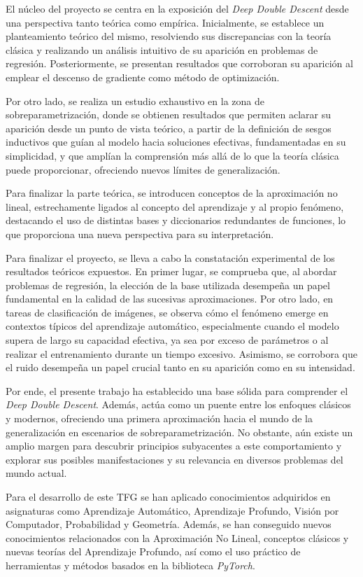 El núcleo del proyecto se centra en la exposición del \textit{Deep Double Descent} desde una perspectiva tanto teórica como empírica. Inicialmente, se establece un planteamiento teórico del mismo, resolviendo sus discrepancias con la teoría clásica y realizando un análisis intuitivo de su aparición en problemas de regresión. Posteriormente, se presentan resultados que corroboran su aparición al emplear el descenso de gradiente como método de optimización. 

Por otro lado, se realiza un estudio exhaustivo en la zona de sobreparametrización, donde se obtienen resultados que permiten aclarar su aparición desde un punto de vista teórico, a partir de la definición de sesgos inductivos que guían al modelo hacia soluciones efectivas, fundamentadas en su simplicidad, y que amplían la comprensión más allá de lo que la teoría clásica puede proporcionar, ofreciendo nuevos límites de generalización.

Para finalizar la parte teórica, se introducen conceptos de la aproximación no lineal, estrechamente ligados al concepto del aprendizaje y al propio fenómeno, destacando el uso de distintas bases y diccionarios redundantes de funciones, lo que proporciona una nueva perspectiva para su interpretación.

Para finalizar el proyecto, se lleva a cabo la constatación experimental de los resultados teóricos expuestos. En primer lugar, se comprueba que, al abordar problemas de regresión, la elección de la base utilizada desempeña un papel fundamental en la calidad de las sucesivas aproximaciones. Por otro lado, en tareas de clasificación de imágenes, se observa cómo el fenómeno emerge en contextos típicos del aprendizaje automático, especialmente cuando el modelo supera de largo su capacidad efectiva, ya sea por exceso de parámetros o al realizar el entrenamiento durante un tiempo excesivo. Asimismo, se corrobora que el ruido desempeña un papel crucial tanto en su aparición como en su intensidad.

Por ende, el presente trabajo ha establecido una base sólida para comprender el \textit{Deep Double Descent}. Además, actúa como un puente entre los enfoques clásicos y modernos, ofreciendo una primera aproximación hacia el mundo de la generalización en escenarios de sobreparametrización. No obstante, aún existe un amplio margen para descubrir principios subyacentes a este comportamiento y explorar sus posibles manifestaciones y su relevancia en diversos problemas del mundo actual.

Para el desarrollo de este TFG se han aplicado conocimientos adquiridos en asignaturas como Aprendizaje Automático, Aprendizaje Profundo, Visión por Computador, Probabilidad y Geometría. Además, se han conseguido nuevos conocimientos relacionados con la Aproximación No Lineal, conceptos clásicos y nuevas teorías del Aprendizaje Profundo, así como el uso práctico de herramientas y métodos basados en la biblioteca \textit{PyTorch}.

